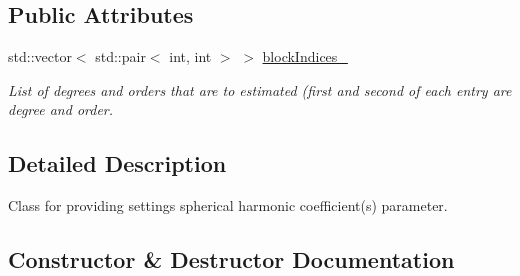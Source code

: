 \subsection*{Public Attributes}
\begin{DoxyCompactItemize}
\item 
std\+::vector$<$ std\+::pair$<$ int, int $>$ $>$ \hyperlink{classtudat_1_1estimatable__parameters_1_1SphericalHarmonicEstimatableParameterSettings_a942330c22efadf29e98750bb49b7b30b}{block\+Indices\+\_\+}\hypertarget{classtudat_1_1estimatable__parameters_1_1SphericalHarmonicEstimatableParameterSettings_a942330c22efadf29e98750bb49b7b30b}{}\label{classtudat_1_1estimatable__parameters_1_1SphericalHarmonicEstimatableParameterSettings_a942330c22efadf29e98750bb49b7b30b}

\begin{DoxyCompactList}\small\item\em List of degrees and orders that are to estimated (first and second of each entry are degree and order. \end{DoxyCompactList}\end{DoxyCompactItemize}


\subsection{Detailed Description}
Class for providing settings spherical harmonic coefficient(s) parameter. 

\subsection{Constructor \& Destructor Documentation}
